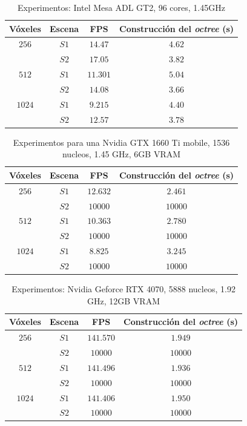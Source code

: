 \begin{table}[ht]
\centering
\begin{tabular}{|c|c|c|c|}
	\hline
	\textbf{Vóxeles} & \textbf{Escena} & \textbf{FPS} & \textbf{Construcción del \textit{octree} (s)} \\
	\hline
	$256$ & $S1$ & $14.47$ & $4.62$ \\
	 & $S2$ & $17.05$ & $3.82$ \\
	\hline
	$512$ & $S1$ & $11.301$ & $5.04$ \\
	 & $S2$ & $14.08$ & $3.66$ \\
	\hline
	$1024$ & $S1$ & $9.215$ & $4.40$ \\
	 & $S2$ & $12.57$ & $3.78$ \\
	\hline
\end{tabular}
\caption{Experimentos: Intel Mesa ADL GT2, 96 cores, 1.45GHz}
\label{tab:cisco-laptop}
\end{table}

\begin{table}[hb]
\centering
\begin{tabular}{|c|c|c|c|}
	\hline
	\textbf{Vóxeles} & \textbf{Escena} & \textbf{FPS} & \textbf{Construcción del \textit{octree} (s)} \\
	\hline
	$256$ & $S1$ & $12.632$ & $2.461$ \\
	 & $S2$ & $10000$ & $10000$ \\
	\hline
	$512$ & $S1$ & $10.363$ & $2.780$ \\
	 & $S2$ & $10000$ & $10000$ \\
	\hline
	$1024$ & $S1$ & $8.825$ & $3.245$ \\
	 & $S2$ & $10000$ & $10000$ \\
	\hline
\end{tabular}
\caption{Experimentos para una Nvidia GTX 1660 Ti mobile, 1536 nucleos, 1.45 GHz, 6GB VRAM}
\label{tab:pizzo-laptop}
\end{table}

\begin{table}[hb]
\centering
\begin{tabular}{|c|c|c|c|}
	\hline
	\textbf{Vóxeles} & \textbf{Escena} & \textbf{FPS} & \textbf{Construcción del \textit{octree} (s)} \\
	\hline
	$256$ & $S1$ & $141.570$ & $1.949$ \\
	 & $S2$ & $10000$ & $10000$ \\
	\hline
	$512$ & $S1$ & $141.496$ & $1.936$ \\
	 & $S2$ & $10000$ & $10000$ \\
	\hline
	$1024$ & $S1$ & $141.406$ & $1.950$ \\
	 & $S2$ & $10000$ & $10000$ \\
	\hline
\end{tabular}
\caption{Experimentos: Nvidia Geforce RTX 4070, 5888 nucleos, 1.92 GHz, 12GB VRAM}
\label{tab:pizzo-desktop}
\end{table}

